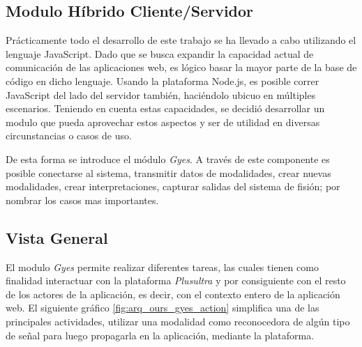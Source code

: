 \subsection{Modulo Híbrido Cliente/Servidor}
Prácticamente todo el desarrollo de este trabajo se ha llevado a cabo utilizando el lenguaje JavaScript. Dado que se busca expandir la capacidad actual de comunicación de las aplicaciones web, es lógico basar la mayor parte de la base de código en dicho lenguaje. Usando la plataforma Node.js, es posible correr JavaScript del lado del servidor también, haciéndolo ubicuo en múltiples escenarios. Teniendo en cuenta estas capacidades, se decidió desarrollar un modulo que pueda aprovechar estos aspectos y ser de utilidad en diversas circunstancias o casos de uso.
 
De esta forma se introduce el módulo \emph{Gyes}. A través de este componente es posible conectarse al sistema, transmitir datos de modalidades, crear nuevas modalidades, crear interpretaciones, capturar salidas del sistema de fisión; por nombrar los casos mas importantes. 

\subsection{Vista General}
El modulo \emph{Gyes} permite realizar diferentes tareas, las cuales tienen como finalidad interactuar con la plataforma \emph{Plusultra} y por consiguiente con el resto de los actores de la aplicación, es decir, con el contexto entero de la aplicación web.
El siguiente gráfico \ref{fig:arq_ours_gyes_action} simplifica una de las principales actividades, utilizar una modalidad como reconocedora de algún tipo de señal para luego propagarla en la aplicación, mediante la plataforma. 

